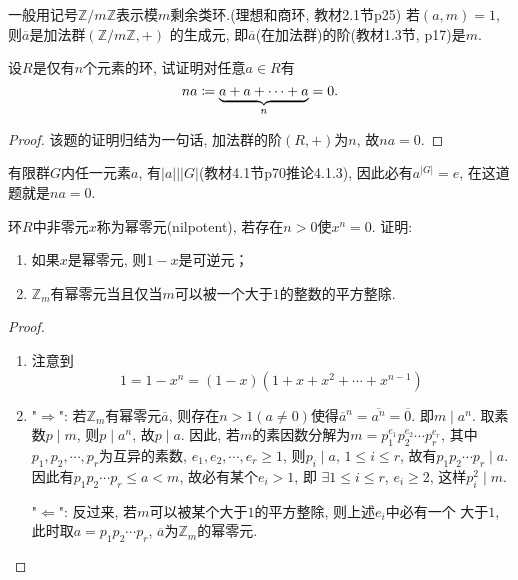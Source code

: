 \begin{remark}
    一般用记号$\mathbb{Z}/m\mathbb{Z}$表示模$m$剩余类环.(理想和商环, 教材2.1节p25)
若$(a, m) = 1$, 则$\overline{a}$是加法群$(\mathbb{Z}/m\mathbb{Z}, +)$
的生成元, 即$\overline{a}$(在加法群)的阶(教材1.3节, p17)是$m$.
\end{remark}

\begin{problem}
    设$R$是仅有$n$个元素的环, 试证明对任意$a \in R$有
\[
    na \mathrel{\coloneqq} \underbrace{a + a + \cdots + a}_n = 0.
\]
\end{problem}
    
\begin{proof}
    该题的证明归结为一句话, 加法群的阶$(R, +)$为$n$, 故$na = 0$.


\end{proof}

\begin{remark}
    有限群$G$内任一元素$a$, 有$|a| \Big| |G|$(教材4.1节p70推论4.1.3),
因此必有$a^{|G|} = e$, 在这道题就是$na = 0$.
\end{remark}

\begin{problem}
    环$R$中非零元$x$称为幂零元(nilpotent), 若存在$n > 0$使$x^n = 0$. 证明: 
\begin{enumerate}[(1)]
    \item 如果$x$是幂零元, 则$1 - x$是可逆元；
    \item $\mathbb{Z}_m$有幂零元当且仅当$m$可以被一个大于$1$的整数的平方整除.
\end{enumerate}
\end{problem}

\begin{proof}
\begin{enumerate}[(1)]
    \item 注意到
\[
    1 = 1 - x^n = (1 - x)(1 + x + x^2 + \cdots + x^{n - 1})
\]
    \item "$\Rightarrow$": 若$\mathbb{Z}_m$有幂零元$\overline{a}$,
    则存在$n > 1(a \neq 0)$使得$\overline{a}^n = \overline{a^n} = \overline{0}$.
    即$m \mid a^n$. 取素数$p \mid m$, 则$p \mid a^n$, 故$p \mid a$.
    因此, 若$m$的素因数分解为$m = p_1^{e_1}p_2^{e_2}\cdots p_r^{e_r}$,
    其中$p_1, p_2, \cdots, p_r$为互异的素数, $e_1, e_2, \cdots, e_r \geqslant 1$,
    则$p_i \mid a,\, 1 \leqslant i \leqslant r$, 故有$p_1p_2\cdots p_r \mid a$.
    因此有$p_1p_2\cdots p_r \leqslant a < m$, 故必有某个$e_i > 1$, 即
    $\exists 1 \leqslant i \leqslant r$, $e_i \geqslant 2$, 这样$p_i^2 \mid m$.

    "$\Leftarrow$": 反过来, 若$m$可以被某个大于$1$的平方整除, 则上述$e_i$中必有一个
    大于$1$, 此时取$a = p_1p_2\cdots p_r$, $\overline{a}$为$\mathbb{Z}_m$的幂零元.
\end{enumerate}
\end{proof}

